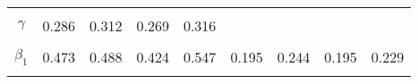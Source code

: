 \begin{footnotesize}
\begin{singlespace}
\begin{tabular}{ccccccccc}
 & \begin{tiny} [0.018,0.035] \end{tiny}  & \begin{tiny} [0.05,0.097] \end{tiny}  & \begin{tiny} [0.006,0.015] \end{tiny}  & \begin{tiny} [0.004,0.011] \end{tiny}  & \begin{tiny} [0.002,0.003] \end{tiny}  & \begin{tiny} [0.098,0.129] \end{tiny}  & \begin{tiny} [0.002,0.003] \end{tiny}  & \begin{tiny} [0.003,0.006] \end{tiny}  \\ 
$\gamma$ & 0.286 & 0.312 & 0.269 & 0.316 &  &  &  &  \\ 
 & \begin{tiny} [0.276,0.297] \end{tiny}  & \begin{tiny} [0.303,0.322] \end{tiny}  & \begin{tiny} [0.257,0.283] \end{tiny}  & \begin{tiny} [0.308,0.325] \end{tiny}  &  &  &  &  \\ 
$ \beta_{1} $ & 0.473 & 0.488 & 0.424 & 0.547 & 0.195 & 0.244 & 0.195 & 0.229 \\ 
 & \begin{tiny} [0.357,0.591] \end{tiny}  & \begin{tiny} [0.385,0.589] \end{tiny}  & \begin{tiny} [0.312,0.546] \end{tiny}  & \begin{tiny} [0.375,0.722] \end{tiny}  & \begin{tiny} [0.124,0.266] \end{tiny}  & \begin{tiny} [0.207,0.281] \end{tiny}  & \begin{tiny} [0.121,0.266] \end{tiny}  & \begin{tiny} [0.16,0.295] \end{tiny}  \\ 

\end{tabular}
\end{singlespace}
\end{footnotesize}
